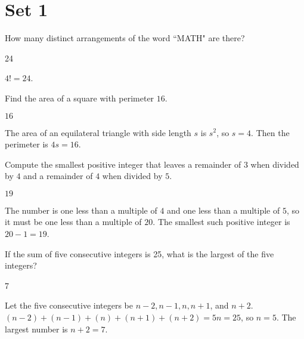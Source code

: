 \documentclass[11pt]{article}
\begin{document}
\section*{Set 1}

\begin{problem}%
How many distinct arrangements of the word ``MATH" are there?
\end{problem}

\begin{answer}
24
\end{answer}

\begin{solution}	
$4! = 24$.
\end{solution}


\begin{problem}
Find the area of a square with perimeter $16$.
\end{problem}

\begin{answer}
$16$
\end{answer}

\begin{solution}
The area of an equilateral triangle with side length $s$ is $s^2$, so $s = 4$. Then the perimeter is $4s = 16$.
\end{solution}


\begin{problem}
Compute the smallest positive integer that leaves a remainder of $3$ when divided by $4$ and a remainder of $4$ when divided by $5$.
\end{problem}

\begin{answer}
$19$
\end{answer}

\begin{solution}
The number is one less than a multiple of $4$ and one less than a multiple of $5$, so it must be one less than a multiple of $20$. The smallest such positive integer is $20 - 1 = 19$.
\end{solution}


\begin{problem}%
If the sum of five consecutive integers is 25, what is the largest of the five integers?
\end{problem}

\begin{answer}
7
\end{answer}
	
\begin{solution}
Let the five consecutive integers be $n-2, n-1, n, n+1$, and $n+2$. $(n-2)+(n-1)+(n)+(n+1)+(n+2) = 5n = 25$, so $n=5$. The largest number is $n+2 = 7$.
\end{solution}
\end{document}
